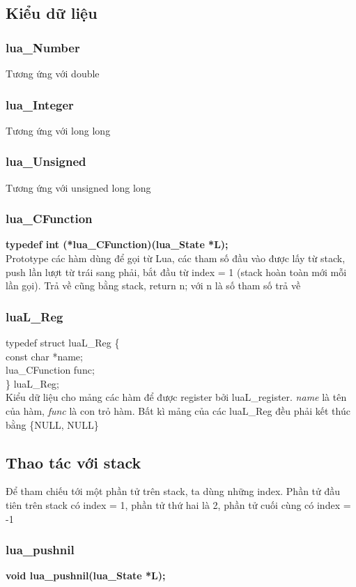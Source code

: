 \documentclass[12pt]{article}
\begin{document}
\subsection{Kiểu dữ liệu}
\subsubsection{lua\_Number}
Tương ứng với double
\subsubsection{lua\_Integer}
Tương ứng với long long
\subsubsection{lua\_Unsigned}
Tương ứng với unsigned long long
\subsubsection{lua\_CFunction} 
\textbf{typedef int (*lua\_CFunction)(lua\_State *L);} \\
Prototype các hàm dùng để gọi từ Lua, các tham số đầu vào được lấy từ stack, push lần lượt từ trái sang phải, bắt đầu từ index = 1 (stack hoàn toàn mới mỗi lần gọi). Trả về cũng bằng stack, return n; với n là số tham số trả về

\subsubsection{luaL\_Reg} 
typedef struct luaL\_Reg \{ \\
\hspace*{1cm} const char *name; \\
\hspace*{1cm} lua\_CFunction func; \\
\} luaL\_Reg; \\
Kiểu dữ liệu cho mảng các hàm để được register bởi luaL\_register. \textit{name} là tên của hàm, \textit{func} là con trỏ hàm. Bất kì mảng của các luaL\_Reg đều phải kết thúc bằng \{NULL, NULL\}


\subsection{Thao tác với stack} 
Để tham chiếu tới một phần tử trên stack, ta dùng những index. Phần tử đầu tiên trên stack có index = 1, phần tử thứ hai là 2, phần tử cuối cùng có index = -1
\subsubsection{lua\_pushnil}
\textbf{void lua\_pushnil(lua\_State *L);} 
\end{document}
